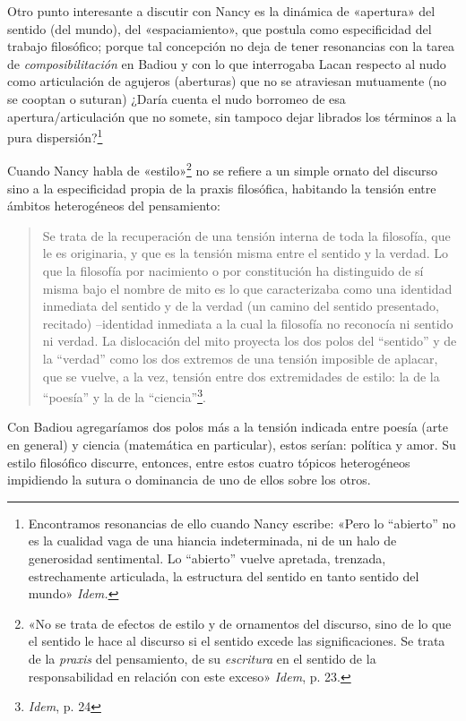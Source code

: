 Otro punto interesante a discutir con Nancy es la dinámica de «apertura» del sentido (del mundo), del «espaciamiento», que postula como especificidad del trabajo filosófico; porque tal concepción no deja de tener resonancias con la tarea de \emph{composibilitación} en Badiou y con lo que interrogaba Lacan respecto al nudo como articulación de agujeros (aberturas) que no se atraviesan mutuamente (no se cooptan o suturan) ¿Daría cuenta el nudo borromeo de esa apertura/articulación que no somete, sin tampoco dejar librados los términos a la pura dispersión?\footnote{Encontramos resonancias de ello cuando Nancy escribe: «Pero lo ``abierto'' no es la cualidad vaga de una hiancia indeterminada, ni de un halo de generosidad sentimental. Lo ``abierto'' vuelve apretada, trenzada, estrechamente articulada, la estructura del sentido en tanto sentido del mundo» \emph{Idem.}}

Cuando Nancy habla de «estilo»\footnote{«No se trata de efectos de estilo y de ornamentos del discurso, sino de lo que el sentido le hace al discurso si el sentido excede las significaciones. Se trata de la \emph{praxis} del pensamiento, de su \emph{escritura} en el sentido de la responsabilidad en relación con este exceso» \emph{Idem}, p. 23.} no se refiere a un simple ornato del discurso sino a la especificidad propia de la praxis filosófica, habitando la tensión entre ámbitos heterogéneos del pensamiento:

\begin{quote}
Se trata de la recuperación de una tensión interna de toda la filosofía, que le es originaria, y que es la tensión misma entre el sentido y la verdad. Lo que la filosofía por nacimiento o por constitución ha distinguido de sí misma bajo el nombre de mito es lo que caracterizaba como una identidad inmediata del sentido y de la verdad (un camino del sentido presentado, recitado) --identidad inmediata a la cual la filosofía no reconocía ni sentido ni verdad. La dislocación del mito proyecta los dos polos del ``sentido'' y de la ``verdad'' como los dos extremos de una tensión imposible de aplacar, que se vuelve, a la vez, tensión entre dos extremidades de estilo: la de la ``poesía'' y la de la ``ciencia''\footnote{\emph{Idem}, p. 24}.
\end{quote}

Con Badiou agregaríamos dos polos más a la tensión indicada entre poesía (arte en general) y ciencia (matemática en particular), estos serían: política y amor. Su estilo filosófico discurre, entonces, entre estos cuatro tópicos heterogéneos impidiendo la sutura o dominancia de uno de ellos sobre los otros.


